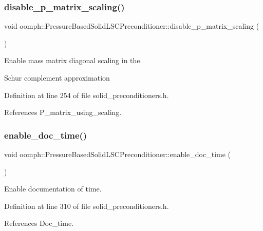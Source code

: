 \subsubsection{\texorpdfstring{disable\+\_\+p\+\_\+matrix\+\_\+scaling()}{disable\_p\_matrix\_scaling()}}
{\footnotesize\ttfamily void oomph\+::\+Pressure\+Based\+Solid\+L\+S\+C\+Preconditioner\+::disable\+\_\+p\+\_\+matrix\+\_\+scaling (\begin{DoxyParamCaption}{ }\end{DoxyParamCaption})\hspace{0.3cm}{\ttfamily [inline]}}



Enable mass matrix diagonal scaling in the. 

Schur complement approximation 

Definition at line 254 of file solid\+\_\+preconditioners.\+h.



References P\+\_\+matrix\+\_\+using\+\_\+scaling.

\mbox{\label{classoomph_1_1PressureBasedSolidLSCPreconditioner_a1bfac76fb2b7451f009d2cb2fea5d07d}} 
\subsubsection{\texorpdfstring{enable\+\_\+doc\+\_\+time()}{enable\_doc\_time()}}
{\footnotesize\ttfamily void oomph\+::\+Pressure\+Based\+Solid\+L\+S\+C\+Preconditioner\+::enable\+\_\+doc\+\_\+time (\begin{DoxyParamCaption}{ }\end{DoxyParamCaption})\hspace{0.3cm}{\ttfamily [inline]}}



Enable documentation of time. 



Definition at line 310 of file solid\+\_\+preconditioners.\+h.



References Doc\+\_\+time.

